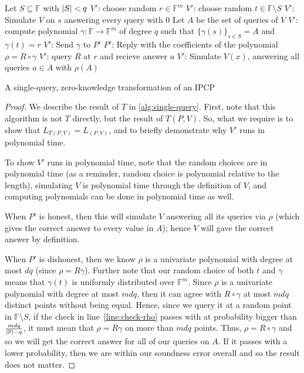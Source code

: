 \documentclass[english,12pt]{reedthesis}
\theoremstyle{plain}
\theoremstyle{definition}
\theoremstyle{remark}
\DeclarePairedDelimiter{\abs}{\lvert}{\rvert}
\begin{document}
\begin{algorithm}[htbp]
  Let $S \subseteq \mathbb{F}$ with $\abs{S} < q$\;
  $V'$: choose random $r \in \mathbb{F}^{m}$\;
  $V'$: choose random $t \in \mathbb{F} \setminus S$\;
  $V'$: Simulate $V$ on $s$ answering every query with
  $0$\;
  Let $A$ be the set of queries of $V$\;
  $V'$: compute polynomial $\gamma\colon \mathbb{F} \rightarrow \mathbb{F}^{m}$ of degree $q$
  such that $\{\gamma(s)\}_{s \in S} = A$ and $\gamma(t) = r$\;
  $V'$: Send $\gamma$ to $P'$\;
  $P'$: Reply with the coefficients of the polynomial $\rho = R \circ \gamma$\;
  $V'$: query $R$ at $r$ and recieve answer $a$\;
  $V'$: Simulate $V(x)$, answering all queries $a \in A$ with
  $\rho(A)$\;
  \;
  \caption{A single-query, zero-knowledge transformation of an
    IPCP~\cite[Construction 4]{CFGS22}}\label{alg:single-query}
\end{algorithm}

\begin{proof}
  We describe the result of $T$ in \cref{alg:single-query}. First, note that
  this algorithm is not $T$ directly, but the result of $T(P, V)$. So, what we
  require is to show that $L_{T(P, V)} = L_{(P, V)}$, and to briefly demonstrate
  why $V'$ runs in polynomial time.

  To show $V'$ runs in polynomial time, note that the random choices are in
  polynomial time (as a reminder, random choice is polynomial relative to the
  length), simulating $V$ is polynomial time through the definition of $V$, and
  computing polynomials can be done in polynomial time as well.

  When $P'$ is honest, then this will simulate $V$ answering all its queries via
  $\rho$ (which gives the correct answer to every value in $A$); hence $V$ will
  gave the correct answer by definition.

  When $P'$ is dishonest, then we know $\rho$ is a univariate polynomial with
  degree at most $dq$ (since $\rho = R\gamma$). Further note that our random choice of
  both $t$ and $\gamma$ means that $\gamma(t)$ is uniformly distributed over
  $\mathbb{F}^{m}$. Since $\rho$ is a univariate polynomial with degree at most
  $mdq$, then it can agree with $R \circ \gamma$ at most $mdq$ distinct points without
  being equal. Hence, since we query it at a random point in $\mathbb{F} \setminus S$,
  if the check in line~\ref{line:check-rho} passes with at probability bigger
  than $\frac{mdq}{\abs{\mathbb{F}} - q}$, it must mean that $\rho = R\gamma$ on more
  than $mdq$ points. Thus, $\rho = R \circ \gamma$ and so we will get the correct answer for
  all of our queries on $A$. If it passes with a lower probability, then we are
  within our soundness error overall and so the result does not matter.
\end{proof}
\end{document}
